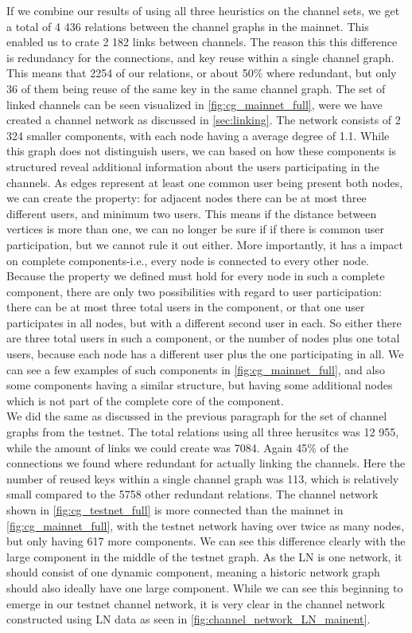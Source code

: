 If we combine our results of using all three heuristics on the channel sets, we get a total of 4 436 relations between the channel graphs in the mainnet. This enabled us to crate 2 182 links between channels. The reason this this difference is redundancy for the connections, and key reuse within a single channel graph. This means that 2254 of our relations, or about 50\% where redundant, but only 36 of them being reuse of the same key in the same channel graph. The set of linked channels can be seen visualized in \cref{fig:cg_mainnet_full}, were we have created a channel network as discussed in \cref{sec:linking}. The network consists of 2 324 smaller components, with each node having a average degree of 1.1. While this graph does not distinguish users, we can based on how these components is structured reveal additional information about the users participating in the channels. 
As edges represent at least one common user being present both nodes, we can create the property: for adjacent nodes there can be at most three different users, and minimum two users. This means if the distance between vertices is more than one, we can no longer be sure if if there is common user participation, but we cannot rule it out either. More importantly, it has a impact on complete components-i.e., every node is connected to every other node. Because the property we defined must hold for every node in such a complete component, there are only two possibilities with regard to user participation: there can be at most three total users in the component, or that one user participates in all nodes, but with a different second user in each. 
So either there are three total users in such a component, or the number of nodes plus one total users, because each node has a different user plus the one participating in all.
We can see a few examples of such components in \cref{fig:cg_mainnet_full}, and also some components having a similar structure, but having some additional nodes which is not part of the complete core of the component.
\\

We did the same as discussed in the previous paragraph for the set of channel graphs from the testnet. The total relations using all three herusitcs was 12 955, while the amount of links we could create was 7084. Again 45\% of the connections we found where redundant for actually linking the channels. Here the number of reused keys within a single channel graph was 113, which is relatively small compared to the 5758 other redundant relations.
The channel network shown in \cref{fig:cg_testnet_full} is more connected than the mainnet in \cref{fig:cg_mainnet_full}, with the testnet network having over twice as many nodes, but only having 617 more components. We can see this difference clearly with the large component in the middle of the testnet graph. As the LN is one network, it should consist of one dynamic component, meaning a historic network graph should also ideally have one large component. While we can see this beginning to emerge in our testnet channel network, it is very clear in the channel network constructed using LN data as seen in \cref{fig:channel_network_LN_mainent}.
\\

